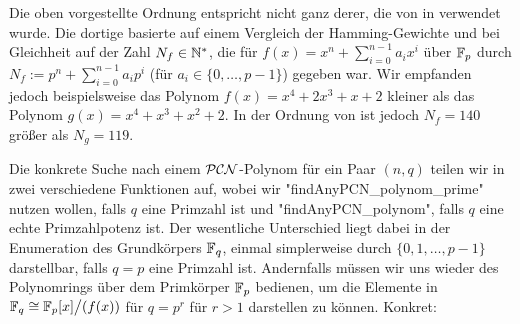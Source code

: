 \begin{bemerkung}
  Die oben vorgestellte Ordnung entspricht nicht ganz derer, die von 
  \citeauthor{morgan1996} in \autocite{morgan1996} verwendet wurde. Die dortige
  basierte auf einem Vergleich der Hamming-Gewichte und bei Gleichheit auf 
  der Zahl $N_f \in \mathbb{N}^\ast$, die für
  $f(x) = x^n+\sum_{i=0}^{n-1} a_ix^i$ über $\mathbb{F}_p$ durch
  $N_f := p^n + \sum_{i=0}^{n-1} a_ip^i$ (für $a_i \in \{0,\ldots,p-1\}$)
  gegeben war. Wir empfanden jedoch beispielsweise das Polynom
  $f(x) = x^4+2x^3+x+2$ kleiner als das Polynom
  $g(x) = x^4+x^3+x^2+2$. In der Ordnung von \citeauthor{morgan1996} ist jedoch
  $N_f = 140$ größer als $N_g = 119$.
\end{bemerkung}


Die konkrete Suche nach einem $\mathcal{PCN}$-Polynom für ein Paar $(n,q)$ 
teilen wir in zwei verschiedene Funktionen auf, wobei wir
"findAnyPCN_polynom_prime" nutzen wollen, falls $q$ eine Primzahl ist und
"findAnyPCN_polynom", falls $q$ eine echte Primzahlpotenz ist. Der wesentliche
Unterschied liegt dabei in der Enumeration des Grundkörpers $\mathbb{F}_q$, einmal
simplerweise durch $\{0,1,\ldots,p-1\}$ darstellbar, falls $q = p$ eine
Primzahl ist. Andernfalls müssen wir uns wieder des Polynomrings
über dem Primkörper $\mathbb{F}_p$ bedienen, um die Elemente in
$\mathbb{F}_q \cong \mathbb{F}_p[x]\big/(f(x))$ für $q=p^r$ für $r>1$ darstellen zu können.
Konkret:

